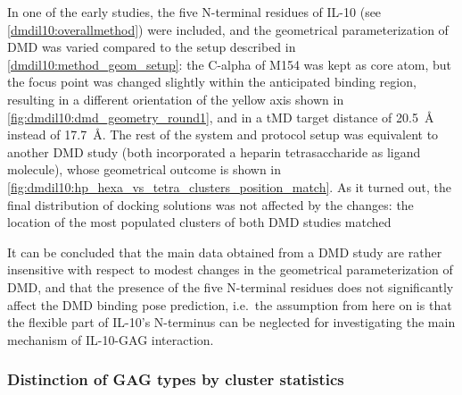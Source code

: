 In one of the early studies, the five N-terminal residues of IL-10 (see
\ref{dmdil10:overallmethod}) were included, and the geometrical parameterization
of DMD was varied compared to the setup described in
\ref{dmdil10:method_geom_setup}: the C-alpha of M154 was kept as core atom, but
the focus point was changed slightly within the anticipated binding region,
resulting in a different orientation of the yellow axis shown in
\cref{fig:dmdil10:dmd_geometry_round1}, and in a tMD target distance of
\SI{20.5}{\angstrom} instead of \SI{17.7}{\angstrom}. The rest of the system and
protocol setup was equivalent to another DMD study (both incorporated a heparin
tetrasaccharide as ligand molecule), whose geometrical outcome is shown in
\cref{fig:dmdil10:hp_hexa_vs_tetra_clusters_position_match}. As it turned out,
the final distribution of docking solutions was not affected by the changes: the
location of the most populated clusters of both DMD studies matched


It can be concluded that the main data obtained from a DMD study are rather
insensitive with respect to modest changes in the geometrical parameterization
of DMD, and that the presence of the five N-terminal residues does not
significantly affect the DMD binding pose prediction, i.e.\ the assumption from
here on is that the flexible part of IL-10's N-terminus can be neglected for
investigating the main mechanism of IL-10-GAG interaction.


\subsubsection{Distinction of GAG types by cluster statistics}

